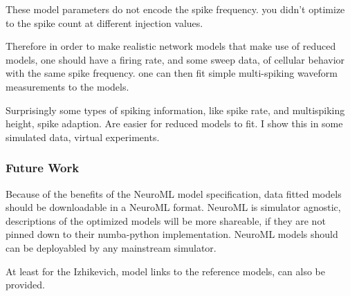  These model parameters do not encode the spike frequency.
you didn't optimize to the spike count at different injection values.

Therefore in order to make realistic network models that make use of reduced models, 
one should have a firing rate, and some sweep data, of cellular behavior with the same spike frequency.
one can then fit simple multi-spiking waveform measurements to the models.

Surprisingly some types of spiking information, like spike rate, and multispiking height, spike adaption.
Are easier for reduced models to fit. I show this in some simulated data, virtual experiments.


\subsubsection{Future Work}
Because of the benefits of the NeuroML model specification, data fitted models should be downloadable in a NeuroML format. NeuroML is simulator agnostic, descriptions of the optimized models will be more shareable, if they are not pinned down to their numba-python implementation. NeuroML models should can be deployabled by any mainstream simulator. %

At least for the Izhikevich, model links to the reference models, can also be provided.